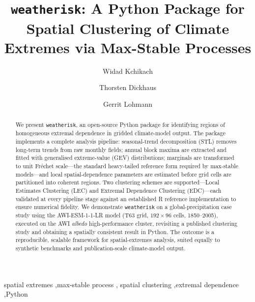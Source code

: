 \documentclass[preprint,12pt,a4paper]{elsarticle}
\begin{document}
\begin{frontmatter}

\title{\texttt{weatherisk}: A Python Package for Spatial Clustering
  of Climate Extremes via Max-Stable Processes}

\author[awi,uni]{Widad Kchikach}

\author[uni]{Thorsten Dickhaus}
\author[awi,uni]{Gerrit Lohmann}

\address[awi]{Alfred Wegener Institute Helmholtz Centre for Polar
  and Marine Research, Bremerhaven, Germany}
\address[uni]{University of Bremen, Bremen, Germany}

\begin{abstract}
We present \texttt{weatherisk}, an open-source Python package for
identifying regions of homogeneous extremal dependence in gridded
climate-model output. The package implements a
complete analysis pipeline: seasonal-trend decomposition (STL) removes
long-term trends from raw monthly fields; annual block maxima are
extracted and fitted with generalised extreme-value (GEV)
distributions; marginals are transformed to unit Fr\'{e}chet
scale---the standard heavy-tailed reference form required by max-stable
models---and local spatial-dependence parameters are estimated before
grid cells are partitioned into coherent regions. Two clustering
schemes are supported---Local Estimates Clustering (LEC) and Extremal
Dependence Clustering (EDC)---each validated at every pipeline stage
against an established R reference implementation to ensure numerical
fidelity. We demonstrate \texttt{weatherisk} on a global-precipitation
case study using the AWI-ESM-1-1-LR model (T63 grid, $192\times96$
cells, 1850--2005), executed on the AWI \emph{albedo}
high-performance cluster, revisiting a published clustering study
and obtaining a spatially consistent result in Python. The outcome
is a reproducible, scalable framework for
spatial-extremes analysis, suited equally to synthetic benchmarks and
publication-scale climate-model output.
\end{abstract}

\begin{keyword}
spatial extremes \sep max-stable process \sep
spatial clustering \sep extremal dependence \sep Python
\end{keyword}

\end{frontmatter}

\end{document}
